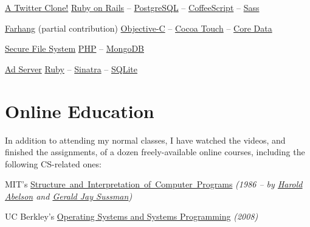 \documentclass{tccv}
\begin{document}
{{\begin{oneline_projects}
\item{\href{https://github.com/pooriaazimi/twitter}{A Twitter Clone!}}
	 {%
		 \href{http://rubyonrails.org}{Ruby on Rails} -- 
		 \href{http://www.postgresql.org}{PostgreSQL} -- 
		 \href{http://coffeescript.org}{CoffeeScript} -- 
		 \href{http://sass-lang.com}{Sass}%
	 }


\item{\href{http://www.turnedondigital.com/?portfolio=farhang-iphone-app}{Farhang} \large{(partial contribution)}}
	 {%
	 	\href{https://en.wikipedia.org/wiki/Objective-C}{Objective-C} -- 
		\href{https://en.wikipedia.org/wiki/Cocoa_Touch}{Cocoa Touch} -- 
		\href{https://en.wikipedia.org/wiki/Core_Data}{Core Data}%
	 }

\item{\href{https://github.com/pooriaazimi/secure_file_system}{Secure File System}}
	 {%
		 \href{http://php.net}{PHP} -- 
		 \href{http://www.mongodb.org}{MongoDB}%
	 }

\item{\href{https://github.com/pooriaazimi/adserver}{Ad Server}}
	 {%
	 	\href{https://www.ruby-lang.org/en/}{Ruby} -- 
		\href{http://www.sinatrarb.com}{Sinatra} -- 
		\href{http://www.sqlite.org}{SQLite}%
	 }


\end{oneline_projects}












\section{Online Education}

In addition to attending my normal classes, I have watched the videos, and finished the assignments, of a dozen freely-available online courses, \mbox{including} the following CS-related ones:

\begin{list}{}{\leftmargin=1em}

\item MIT's \href{http://groups.csail.mit.edu/mac/classes/6.001/abelson-sussman-lectures/}{\mbox{Structure and Interpretation of Computer Programs}} {\it(1986 -- by \href{https://en.wikipedia.org/wiki/Hal_Abelson}{Harold Abelson} and \href{https://en.wikipedia.org/wiki/Gerald_Jay_Sussman}{Gerald Jay Sussman})}

\item UC Berkley's \href{http://www.cs.berkeley.edu/~kubitron/courses/cs162-F08/}{Operating Systems and Systems Programming} {\it(2008)}


\end{list}}}
\end{document}
